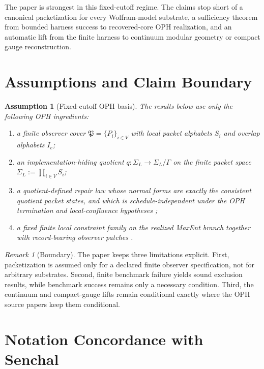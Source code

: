 \documentclass[11pt]{article}
\newtheorem{assumption}[theorem]{Assumption}
\theoremstyle{remark}
\newtheorem{remark}[theorem]{Remark}
\theoremstyle{plain}
\begin{document}
The paper is strongest in this fixed-cutoff regime. The claims stop short of a canonical packetization for every Wolfram-model substrate, a sufficiency theorem from bounded harness success to recovered-core OPH realization, and an automatic lift from the finite harness to continuum modular geometry or compact gauge reconstruction.

\section{Assumptions and Claim Boundary}
\label{sec:boundary}

\begin{assumption}[Fixed-cutoff OPH basis]
\label{ass:fixedcutoff}
The results below use only the following OPH ingredients:
\begin{enumerate}[label=(A\arabic*),leftmargin=2em]
\item a finite observer cover \(\mathfrak P=\{P_i\}_{i\in V}\) with local packet alphabets \(S_i\) and overlap alphabets \(I_e\);
\item an implementation-hiding quotient \(q:\Sigma_L\to \Sigma_L/\Gamma\) on the finite packet space \(\Sigma_L:=\prod_{i\in V}S_i\);
\item a quotient-defined repair law whose normal forms are exactly the consistent quotient packet states, and which is schedule-independent under the OPH termination and local-confluence hypotheses \cite{ophconsensus};
\item a fixed finite local constraint family on the realized MaxEnt branch together with record-bearing observer patches \cite{ophsynthesis,ophmicrophysics}.
\end{enumerate}
\end{assumption}

\begin{remark}[Boundary]
The paper keeps three limitations explicit. First, packetization is assumed only for a declared finite observer specification, not for arbitrary substrates. Second, finite benchmark failure yields sound exclusion results, while benchmark success remains only a necessary condition. Third, the continuum and compact-gauge lifts remain conditional exactly where the OPH source papers keep them conditional.
\end{remark}

\section{Notation Concordance with Senchal}
\label{sec:notation}
\end{document}
